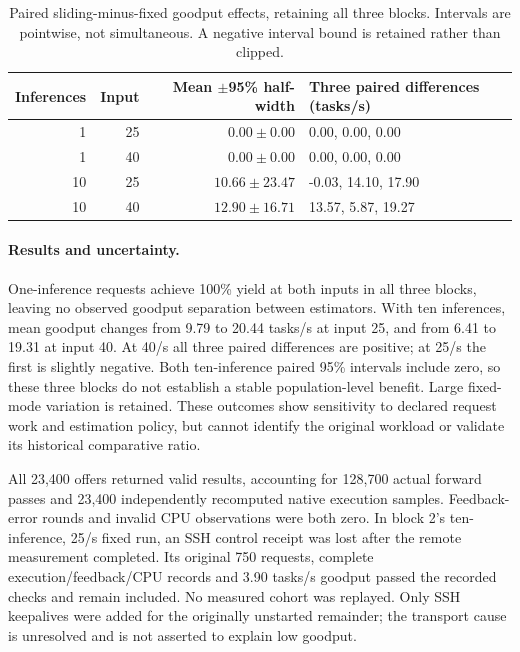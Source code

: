 \begin{table}[htbp]
\centering\small
\caption{Paired sliding-minus-fixed goodput effects, retaining all three blocks. Intervals are pointwise, not simultaneous. A negative interval bound is retained rather than clipped.}
\label{tab:estimator-reconstruction-pairs}
\begin{tabular}{rrrl}
\toprule
Inferences & Input & Mean $\pm$95\% half-width & Three paired differences (tasks/s)\\
\midrule
1 & 25 & $0.00\pm0.00$ & 0.00, 0.00, 0.00\\
1 & 40 & $0.00\pm0.00$ & 0.00, 0.00, 0.00\\
10 & 25 & $10.66\pm23.47$ & -0.03, 14.10, 17.90\\
10 & 40 & $12.90\pm16.71$ & 13.57, 5.87, 19.27\\
\bottomrule
\end{tabular}
\end{table}


\paragraph{Results and uncertainty.}
One-inference requests achieve 100\% yield at both inputs in all three blocks, leaving no observed goodput separation between estimators. With ten inferences, mean goodput changes from 9.79 to 20.44 tasks/s at input 25, and from 6.41 to 19.31 at input 40. At 40/s all three paired differences are positive; at 25/s the first is slightly negative. Both ten-inference paired 95\% intervals include zero, so these three blocks do not establish a stable population-level benefit. Large fixed-mode variation is retained. These outcomes show sensitivity to declared request work and estimation policy, but cannot identify the original workload or validate its historical comparative ratio.

All 23,400 offers returned valid results, accounting for 128,700 actual forward passes and 23,400 independently recomputed native execution samples. Feedback-error rounds and invalid CPU observations were both zero. In block 2's ten-inference, 25/s fixed run, an SSH control receipt was lost after the remote measurement completed. Its original 750 requests, complete execution/feedback/CPU records and 3.90 tasks/s goodput passed the recorded checks and remain included. No measured cohort was replayed. Only SSH keepalives were added for the originally unstarted remainder; the transport cause is unresolved and is not asserted to explain low goodput.

